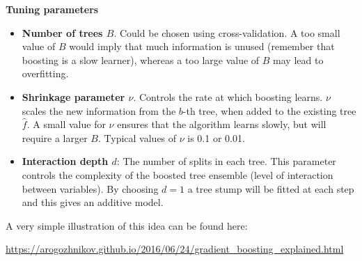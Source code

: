 \documentclass[
  10pt,
  ignorenonframetext,
]{beamer}
\providecommand{\tightlist}{%
  \setlength{\itemsep}{0pt}\setlength{\parskip}{0pt}}
\begin{document}
\begin{frame}
\textbf{Tuning parameters}

\vspace{2mm}

\begin{itemize}
\tightlist
\item
  \textbf{Number of trees \(B\)}. Could be chosen using
  cross-validation. A too small value of \(B\) would imply that much
  information is unused (remember that boosting is a slow learner),
  whereas a too large value of \(B\) may lead to overfitting.
\end{itemize}

\vspace{1mm}

\begin{itemize}
\tightlist
\item
  \textbf{Shrinkage parameter \(\nu\)}. Controls the rate at which
  boosting learns. \(\nu\) scales the new information from the \(b\)-th
  tree, when added to the existing tree \(\hat{f}\). A small value for
  \(\nu\) ensures that the algorithm learns slowly, but will require a
  larger \(B\). Typical values of \(\nu\) is 0.1 or 0.01.
\end{itemize}

\vspace{1mm}

\begin{itemize}
\tightlist
\item
  \textbf{Interaction depth \(d\)}: The number of splits in each tree.
  This parameter controls the complexity of the boosted tree ensemble
  (level of interaction between variables). By choosing \(d=1\) a tree
  stump will be fitted at each step and this gives an additive model.
\end{itemize}
\end{frame}

\begin{frame}
A very simple illustration of this idea can be found here:

\url{https://arogozhnikov.github.io/2016/06/24/gradient_boosting_explained.html}
\end{frame}
\end{document}
